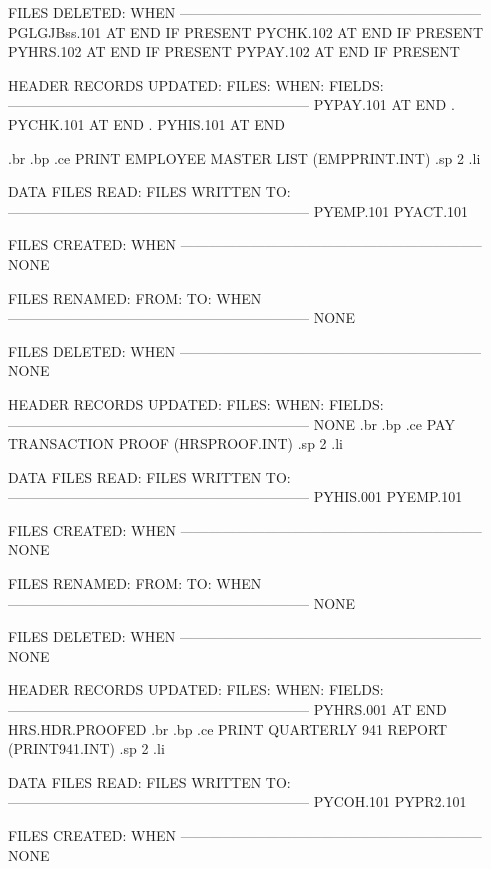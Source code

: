 FILES DELETED:			  WHEN
-----------------------------------------------------------------
       PGLGJBss.101	      AT END IF PRESENT
       PYCHK.102	      AT END IF PRESENT
       PYHRS.102	      AT END IF PRESENT
       PYPAY.102	      AT END IF PRESENT


HEADER RECORDS UPDATED:
FILES:		 WHEN:		    FIELDS:
-----------------------------------------------------------------
 PYPAY.101	AT END		   .
 PYCHK.101	AT END		   .
 PYHIS.101	AT END

.br
.bp
.ce
PRINT EMPLOYEE MASTER LIST  (EMPPRINT.INT)
.sp 2
.li

DATA FILES READ:		   FILES WRITTEN TO:
-----------------------------------------------------------------
       PYEMP.101
       PYACT.101

FILES CREATED:			  WHEN
-----------------------------------------------------------------
       NONE


FILES RENAMED:
  FROM:        TO:		  WHEN
-----------------------------------------------------------------
       NONE


FILES DELETED:			  WHEN
-----------------------------------------------------------------
       NONE


HEADER RECORDS UPDATED:
FILES:		 WHEN:		    FIELDS:
-----------------------------------------------------------------
      NONE
.br
.bp
.ce
PAY TRANSACTION PROOF  (HRSPROOF.INT)
.sp 2
.li

DATA FILES READ:		   FILES WRITTEN TO:
-----------------------------------------------------------------
       PYHIS.001
       PYEMP.101

FILES CREATED:			  WHEN
-----------------------------------------------------------------
       NONE


FILES RENAMED:
  FROM:        TO:		  WHEN
-----------------------------------------------------------------
       NONE


FILES DELETED:			  WHEN
-----------------------------------------------------------------
       NONE


HEADER RECORDS UPDATED:
FILES:		 WHEN:		    FIELDS:
-----------------------------------------------------------------
      PYHRS.001   AT END	HRS.HDR.PROOFED%
.br
.bp
.ce
PRINT QUARTERLY 941 REPORT  (PRINT941.INT)
.sp 2
.li

DATA FILES READ:		   FILES WRITTEN TO:
-----------------------------------------------------------------
       PYCOH.101			PYPR2.101

FILES CREATED:			  WHEN
-----------------------------------------------------------------
       NONE


